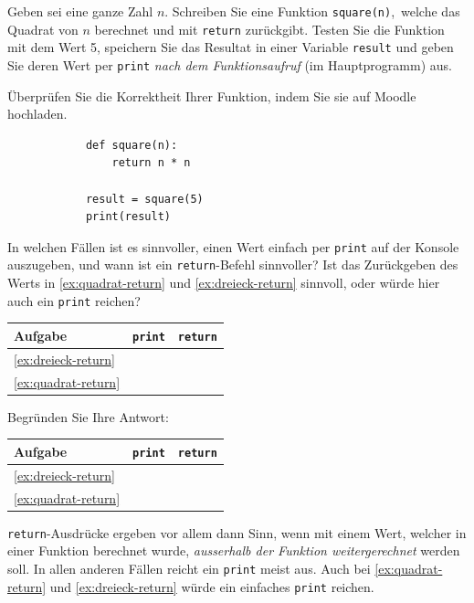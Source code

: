 \begin{myexercise}\label{ex:quadrat-return}
	Geben sei eine ganze Zahl \(n\). Schreiben Sie eine Funktion \lstinline|square(n)|, welche das Quadrat von \(n\) berechnet und mit \lstinline|return| zurückgibt. Testen Sie die Funktion mit dem Wert 5, speichern Sie das Resultat in einer Variable \lstinline|result| und geben Sie deren Wert per \lstinline|print| \textit{nach dem Funktionsaufruf} (im Hauptprogramm) aus.

	Überprüfen Sie die Korrektheit Ihrer Funktion, indem Sie sie auf Moodle hochladen.
	\begin{myanswer}
		\begin{lstlisting}
			def square(n):
				return n * n

			result = square(5)
			print(result)
		\end{lstlisting}
	\end{myanswer}
\end{myexercise}

\begin{myexercise}\label{ex:print-vs-return}
	In welchen Fällen ist es sinnvoller, einen Wert einfach per \lstinline|print| auf der Konsole auszugeben, und wann ist ein \lstinline|return|-Befehl sinnvoller? Ist das Zurückgeben des Werts in \cref{ex:quadrat-return} und \cref{ex:dreieck-return} sinnvoll, oder würde hier auch ein \lstinline|print| reichen?

	\begin{center}
		\begin{tabular}{l|c|c}
			\textbf{Aufgabe} & \lstinline|print| & \lstinline|return| \\
			\midrule\midrule
			\cref{ex:dreieck-return} & & \\
			\midrule
			\cref{ex:quadrat-return} & & \\
		\end{tabular}
	\end{center}

	Begründen Sie Ihre Antwort:
	\begin{myanswer}
		\begin{center}
		\begin{tabular}{l|c|c}
			\textbf{Aufgabe} & \lstinline|print| & \lstinline|return| \\
			\midrule\midrule
			\cref{ex:dreieck-return} & \faCheckSquare & \\
			\midrule
			\cref{ex:quadrat-return} & \faCheckSquare & \\
		\end{tabular}
	\end{center}
		\lstinline|return|-Ausdrücke ergeben vor allem dann Sinn, wenn mit einem Wert, welcher in einer Funktion berechnet wurde, \textit{ausserhalb der Funktion weitergerechnet} werden soll. In allen anderen Fällen reicht ein \lstinline|print| meist aus. Auch bei \cref{ex:quadrat-return} und \cref{ex:dreieck-return} würde ein einfaches \lstinline|print| reichen.
	\end{myanswer}
\end{myexercise}

